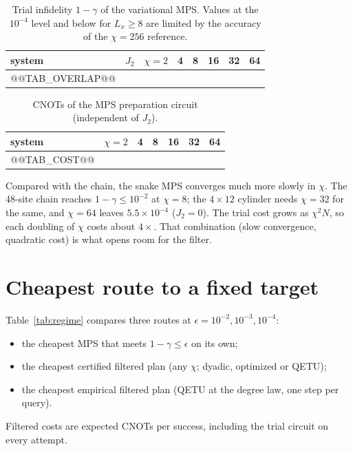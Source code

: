 \documentclass[10pt]{article}
\begin{document}
\begin{table}[h]
\centering\small
\caption{Trial infidelity $1-\gamma$ of the variational MPS. Values at the $10^{-4}$ level and below for
$L_x\ge8$ are limited by the accuracy of the $\chi=256$ reference.}
\begin{tabular}{lrcccccc}
\toprule
system & $J_2$ & $\chi=2$ & 4 & 8 & 16 & 32 & 64 \\
\midrule
@@TAB_OVERLAP@@
\bottomrule
\end{tabular}
\end{table}

\begin{table}[h]
\centering\small
\caption{CNOTs of the MPS preparation circuit (independent of $J_2$).}
\begin{tabular}{lcccccc}
\toprule
system & $\chi=2$ & 4 & 8 & 16 & 32 & 64 \\
\midrule
@@TAB_COST@@
\bottomrule
\end{tabular}
\end{table}

Compared with the chain, the snake MPS converges much more slowly in $\chi$. The 48-site chain reaches
$1-\gamma\le10^{-2}$ at $\chi=8$; the $4\times12$ cylinder needs $\chi=32$ for the same, and $\chi=64$ leaves
$5.5\times10^{-4}$ ($J_2=0$). The trial cost grows as $\chi^2N$, so each doubling of $\chi$ costs about $4\times$.
That combination (slow convergence, quadratic cost) is what opens room for the filter.

\section{Cheapest route to a fixed target}

Table~\ref{tab:regime} compares three routes at $\epsilon=10^{-2},10^{-3},10^{-4}$:
\begin{itemize}
\item the cheapest MPS that meets $1-\gamma\le\epsilon$ on its own;
\item the cheapest certified filtered plan (any $\chi$; dyadic, optimized or QETU);
\item the cheapest empirical filtered plan (QETU at the degree law, one step per query).
\end{itemize}
Filtered costs are expected CNOTs per success, including the trial circuit on every attempt.

\begin{table}[h]
\centering\footnotesize
\caption{CNOTs (bond dimension in parentheses). M: MPS alone. C: certified filter. E: empirical filter.
``--'': no $\chi\le64$ route.}
\label{tab:regime}
\end{table}
\end{document}
